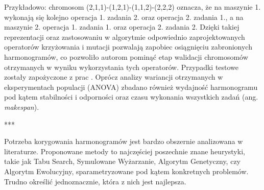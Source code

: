 \documentclass[printmode,oneside]{mgr}
\begin{document}
Przykładowo: chromosom (2,1,1)-(1,2,1)-(1,1,2)-(2,2,2) oznacza, że na maszynie 1. wykonają się kolejno operacja 1. zadania 2. oraz operacja 2. zadania 1., a na maszynie 2. operacja 1. zadania 1. oraz operacja 2. zadania 2. Dzięki takiej reprezentacji oraz zastosowaniu w algorytmie odpowiednio zaprojektowanych operatorów krzyżowania i mutacji pozwalają zapobiec osiągnięciu zabronionych harmonogramów, co pozwoliło autorom pominąć etap walidacji chromosomów otrzymanych w wyniku wykorzystania tych operatorów. Przypadki testowe zostały zapożyczone z prac \cite{Kacem2002b,Mesghouni1997,LeeDiCesare1994,Kacem2002a,Brandimarte1993}. Oprócz analizy wariancji otrzymanych w eksperymentach populacji (ANOVA) zbadano również wydajność harmonogramu pod kątem stabilności i odporności oraz czasu wykonania wszystkich zadań (ang. \emph{makespan}).
\begin{center}***\\\end{center}
Potrzeba korygowania harmonogramów jest bardzo obszernie analizowana w literaturze. Proponowane metody to najczęściej poszechnie znane heurystyki, takie jak Tabu Search, Symulowane Wyżarzanie, Algorytm Genetyczny, czy Algorytm Ewolucyjny, sparametryzowane pod kątem konkretnych problemów. Trudno określić jednoznacznie, która z nich jest najlepsza.
%
%
%
\end{document}
